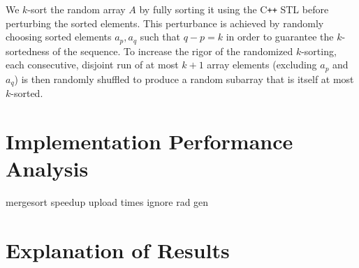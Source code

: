 \documentclass[letterpaper, 12pt]{article}
\begin{document}
We $k$-sort the random array $A$ by fully sorting it using the C\texttt{++} STL before perturbing the sorted elements.
This perturbance is achieved by randomly choosing sorted elements $a_p, a_q$ such that $q - p = k$ in order to guarantee the
  $k$-sortedness of the sequence.
To increase the rigor of the randomized $k$-sorting, each consecutive, disjoint run of at most $k + 1$ array elements
  (excluding $a_p$ and $a_q$) is then randomly shuffled to produce a random subarray that is itself at most $k$-sorted.

\section{Implementation Performance Analysis}
mergesort speedup
upload times
ignore rad gen

\begin{sidewaysfigure}

\vspace{-4ex}
\caption{\label{fig:k2}{\em
  Sort Runtimes over Arrays of Length $n\cdot 10^6$, $k = 2$
}}
\end{sidewaysfigure}

\begin{sidewaysfigure}

\vspace{-4ex}
\caption{\label{fig:k15}{\em
  Sort Runtimes over Arrays of Length $n\cdot 10^6$, $k = 15$
}}
\end{sidewaysfigure}

\begin{sidewaysfigure}

\vspace{-4ex}
\caption{\label{fig:n750k}{\em
  Sort Runtimes over Arrays of Radius $k$, $n = 0.75\cdot 10^6$
}}
\end{sidewaysfigure}

\begin{sidewaysfigure}

\vspace{-4ex}
\caption{\label{fig:n1250k}{\em
  Sort Runtimes over Arrays of Radius $k$, $n = 1.25\cdot 10^6$
}}
\end{sidewaysfigure}

\clearpage
\section{Explanation of Results}
\end{document}

